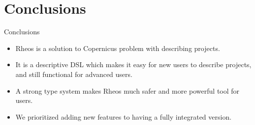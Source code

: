 \section{Conclusions}

\begin{frame}{Conclusions}

\begin{itemize}\pause
\item Rheos is a solution to Copernicus problem with describing
  projects.\pause

\item It is a descriptive DSL which makes it easy for new users to
  describe projects, and still functional for advanced users.\pause

\item A strong type system makes Rheos much safer and more powerful
  tool for users.\pause

\item We prioritized adding new features to having a fully integrated
  version.
\end{itemize}

\end{frame}
